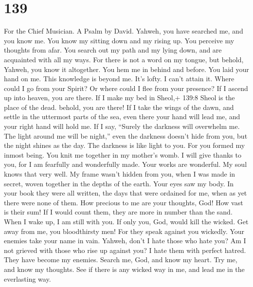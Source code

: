 \hypertarget{section-129}{%
\section{139}\label{section-129}}

For the Chief Musician. A Psalm by David.  Yahweh, you have
searched me, and you know me.  You know my sitting down and
my rising up. You perceive my thoughts from afar.  You
search out my path and my lying down, and are acquainted with all my
ways.  For there is not a word on my tongue, but behold,
Yahweh, you know it altogether.  You hem me in behind and
before. You laid your hand on me.  This knowledge is beyond
me. It's lofty. I can't attain it.  Where could I go from
your Spirit? Or where could I flee from your presence?  If I
ascend up into heaven, you are there. If I make my bed in Sheol,+ 139:8
Sheol is the place of the dead. behold, you are there!  If I
take the wings of the dawn, and settle in the uttermost parts of the
sea,  even there your hand will lead me, and your right
hand will hold me.  If I say, ``Surely the darkness will
overwhelm me. The light around me will be night,''  even
the darkness doesn't hide from you, but the night shines as the day. The
darkness is like light to you.  For you formed my inmost
being. You knit me together in my mother's womb.  I will
give thanks to you, for I am fearfully and wonderfully made. Your works
are wonderful. My soul knows that very well.  My frame
wasn't hidden from you, when I was made in secret, woven together in the
depths of the earth.  Your eyes saw my body. In your book
they were all written, the days that were ordained for me, when as yet
there were none of them.  How precious to me are your
thoughts, God! How vast is their sum!  If I would count
them, they are more in number than the sand. When I wake up, I am still
with you.  If only you, God, would kill the wicked. Get
away from me, you bloodthirsty men!  For they speak against
you wickedly. Your enemies take your name in vain.  Yahweh,
don't I hate those who hate you? Am I not grieved with those who rise up
against you?  I hate them with perfect hatred. They have
become my enemies.  Search me, God, and know my heart. Try
me, and know my thoughts.  See if there is any wicked way
in me, and lead me in the everlasting way.

